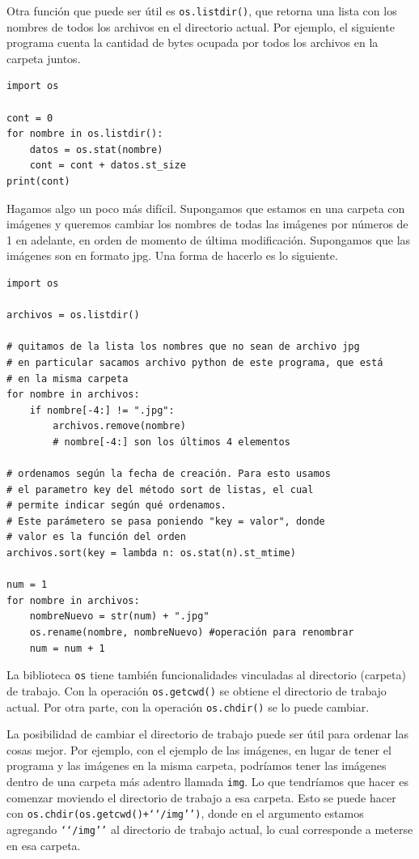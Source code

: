 \documentclass[a4paper, 12pt]{report}
\theoremstyle{definition}
\begin{document}
Otra función que puede ser útil es {\tt os.listdir()}, que retorna una lista con los nombres de todos los archivos en el directorio actual. Por ejemplo, el siguiente programa cuenta la cantidad de bytes ocupada por todos los archivos en la carpeta juntos.
\begin{verbatim}
import os

cont = 0
for nombre in os.listdir():
    datos = os.stat(nombre)
    cont = cont + datos.st_size
print(cont)
\end{verbatim}

Hagamos algo un poco más difícil. Supongamos que estamos en una carpeta con imágenes y queremos cambiar los nombres de todas las imágenes por números de 1 en adelante, en orden de momento de última modificación. Supongamos que las imágenes son en formato jpg. Una forma de hacerlo es lo siguiente.
\begin{verbatim}
import os

archivos = os.listdir()

# quitamos de la lista los nombres que no sean de archivo jpg
# en particular sacamos archivo python de este programa, que está
# en la misma carpeta
for nombre in archivos:
    if nombre[-4:] != ".jpg":
        archivos.remove(nombre)
        # nombre[-4:] son los últimos 4 elementos

# ordenamos según la fecha de creación. Para esto usamos
# el parametro key del método sort de listas, el cual
# permite indicar según qué ordenamos.
# Este parámetero se pasa poniendo "key = valor", donde
# valor es la función del orden
archivos.sort(key = lambda n: os.stat(n).st_mtime)

num = 1
for nombre in archivos:
    nombreNuevo = str(num) + ".jpg"
    os.rename(nombre, nombreNuevo) #operación para renombrar
    num = num + 1
\end{verbatim}

La biblioteca {\tt os} tiene también funcionalidades vinculadas al directorio (carpeta) de trabajo. Con la operación {\tt os.getcwd()} se obtiene el directorio de trabajo actual. Por otra parte, con la operación {\tt os.chdir()} se lo puede cambiar.

La posibilidad de cambiar el directorio de trabajo puede ser útil para ordenar las cosas mejor. Por ejemplo, con el ejemplo de las imágenes, en lugar de tener el programa y las imágenes en la misma carpeta, podríamos tener las imágenes dentro de una carpeta más adentro llamada {\tt img}. Lo que tendríamos que hacer es comenzar moviendo el directorio de trabajo a esa carpeta. Esto se puede hacer con {\tt os.chdir(os.getcwd()+\lq\lq/img\rq\rq)}, donde en el argumento estamos agregando {\tt \lq\lq/img\rq\rq} al directorio de trabajo actual, lo cual corresponde a meterse en esa carpeta.
\end{document}
